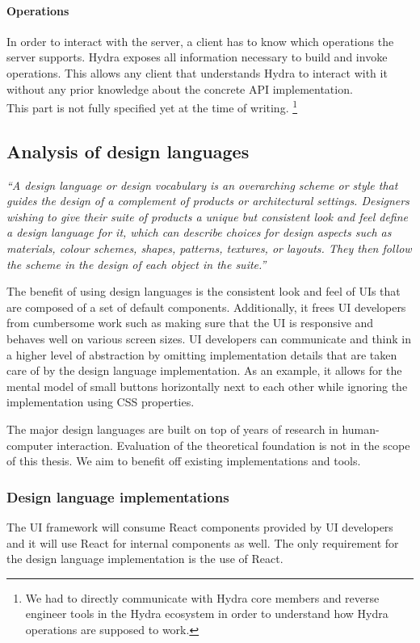 \paragraph{Operations}
In order to interact with the server, a client has to know which operations the server supports. Hydra exposes all information necessary to build and invoke operations. This allows any client that understands Hydra to interact with it without any prior knowledge about the concrete API implementation. \\
This part is not fully specified yet at the time of writing. \footnote{We had to directly communicate with Hydra core members and reverse engineer tools in the Hydra ecosystem in order to understand how Hydra operations are supposed to work.}

\subsection{Analysis of design languages}
\textit{``A design language or design vocabulary is an overarching scheme or style that guides the design of a complement of products or architectural settings. Designers wishing to give their suite of products a unique but consistent look and feel define a design language for it, which can describe choices for design aspects such as materials, colour schemes, shapes, patterns, textures, or layouts. They then follow the scheme in the design of each object in the suite.''} \citep{designlanguage}

The benefit of using design languages is the consistent look and feel of UIs that are composed of a set of default components. Additionally, it frees UI developers from cumbersome work such as making sure that the UI is responsive and behaves well on various screen sizes. UI developers can communicate and think in a higher level of abstraction by omitting implementation details that are taken care of by the design language implementation. As an example, it allows for the mental model of small buttons horizontally next to each other while ignoring the implementation using CSS properties.

The major design languages are built on top of years of research in human-computer interaction. Evaluation of the theoretical foundation is not in the scope of this thesis. We aim to benefit off existing implementations and tools.

\subsubsection{Design language implementations}
The UI framework will consume React components provided by UI developers and it will use React for internal components as well. The only requirement for the design language implementation is the use of React.

